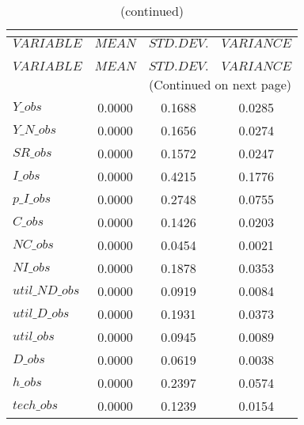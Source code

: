  
\begin{center}
\begin{longtable}{lccc} 
\caption{THEORETICAL MOMENTS}\\
 \label{Table:th_moments}\\
\toprule 
$VARIABLE       $	 & 	 $         MEAN$	 & 	 $    STD. DEV.$	 & 	 $     VARIANCE$\\
\midrule \endfirsthead 
\caption{(continued)}\\
 \toprule \\ 
$VARIABLE       $	 & 	 $         MEAN$	 & 	 $    STD. DEV.$	 & 	 $     VARIANCE$\\
\midrule \endhead 
\midrule \multicolumn{4}{r}{(Continued on next page)} \\ \bottomrule \endfoot 
\bottomrule \endlastfoot 
$Y\_obs         $	 & 	       0.0000	 & 	       0.1688	 & 	       0.0285 \\ 
$Y\_N\_obs      $	 & 	       0.0000	 & 	       0.1656	 & 	       0.0274 \\ 
$SR\_obs        $	 & 	       0.0000	 & 	       0.1572	 & 	       0.0247 \\ 
$I\_obs         $	 & 	       0.0000	 & 	       0.4215	 & 	       0.1776 \\ 
$p\_I\_obs      $	 & 	       0.0000	 & 	       0.2748	 & 	       0.0755 \\ 
$C\_obs         $	 & 	       0.0000	 & 	       0.1426	 & 	       0.0203 \\ 
$NC\_obs        $	 & 	       0.0000	 & 	       0.0454	 & 	       0.0021 \\ 
$NI\_obs        $	 & 	       0.0000	 & 	       0.1878	 & 	       0.0353 \\ 
$util\_ND\_obs  $	 & 	       0.0000	 & 	       0.0919	 & 	       0.0084 \\ 
$util\_D\_obs   $	 & 	       0.0000	 & 	       0.1931	 & 	       0.0373 \\ 
$util\_obs      $	 & 	       0.0000	 & 	       0.0945	 & 	       0.0089 \\ 
$D\_obs         $	 & 	       0.0000	 & 	       0.0619	 & 	       0.0038 \\ 
$h\_obs         $	 & 	       0.0000	 & 	       0.2397	 & 	       0.0574 \\ 
$tech\_obs      $	 & 	       0.0000	 & 	       0.1239	 & 	       0.0154 \\ 
\end{longtable}
 \end{center}
